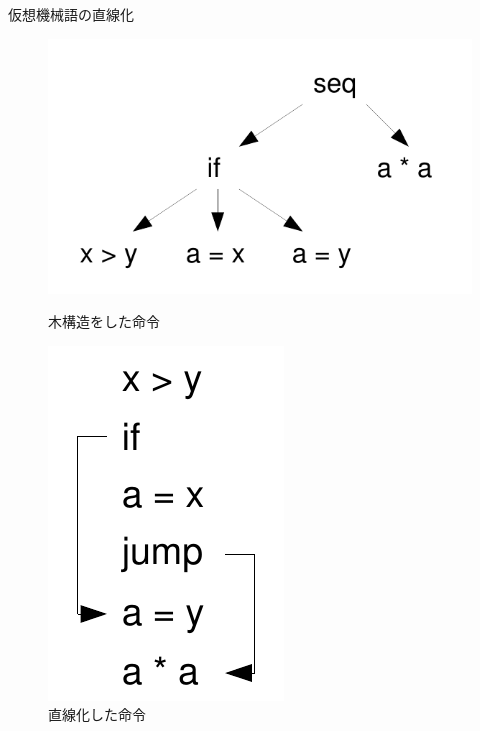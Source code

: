 \documentclass[a4paper,titlepage,report,disablejfam]{jsbook}
\begin{document}
\begin{resbonsiblesection}{仮想機械語の直線化}{\kobori}
\begin{figure}[htb]
\begin{minipage}{0.5\hsize}
 \begin{center}
  \includegraphics[scale=0.6]{instree.pdf}
  \caption{木構造をした命令}\label{fig:impl-instree}
 \end{center}
\end{minipage}
\begin{minipage}{0.5\hsize}
 \begin{center}
  \includegraphics[scale=0.6]{insliner.pdf}
  \caption{直線化した命令}\label{fig:impl-insliner}
 \end{center}
\end{minipage}
\end{figure}
\end{resbonsiblesection}
\end{document}
